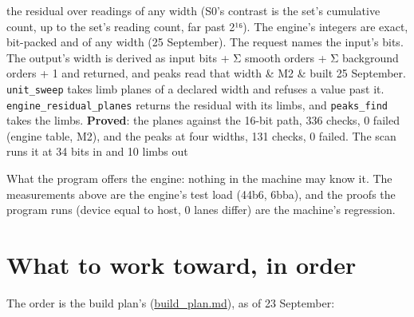 {\begin{longtable}
the residual over readings of any width (S0's contrast is the set's cumulative count, up to the set's reading count, far past 2¹⁶). The engine's integers are exact, bit-packed and of any width (25 September). The request names the input's bits. The output's width is derived as input bits + Σ smooth orders + Σ background orders + 1 and returned, and peaks read that width & M2 & built 25 September. \texttt{unit\_\allowbreak{}sweep} takes limb planes of a declared width and refuses a value past it. \texttt{engine\_\allowbreak{}residual\_\allowbreak{}planes} returns the residual with its limbs, and \texttt{peaks\_\allowbreak{}find} takes the limbs. \textbf{Proved}: the planes against the 16-bit path, 336 checks, 0 failed (engine table, M2), and the peaks at four widths, 131 checks, 0 failed. The scan runs it at 34 bits in and 10 limbs out \\
\bottomrule
\end{longtable}
}

What the program offers the engine: nothing in the machine may know it. The measurements above are the engine's test load (44b6, 6bba), and the proofs the program runs (device equal to host, 0 lanes differ) are the machine's regression.

\section{\texorpdfstring{What to work toward, in order}{What to work toward, in order}}

The order is the build plan's (\hyperref[chap:build-plan]{build\_\allowbreak{}plan.md}), as of 23 September:

